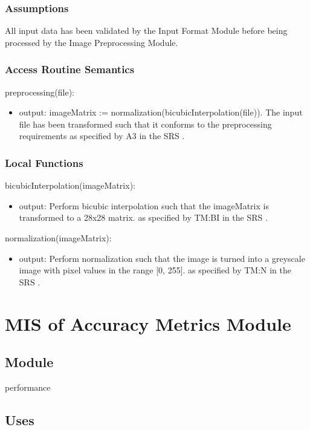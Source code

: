 \documentclass[12pt, titlepage]{article}
\begin{document}
\subsubsection{Assumptions}

All input data has been validated by the Input Format Module before being
processed by the Image Preprocessing Module.

\subsubsection{Access Routine Semantics}

\noindent preprocessing(file):
\begin{itemize} 
\item output: imageMatrix := normalization(bicubicInterpolation(file)). The
input file has been transformed such that it conforms to the preprocessing
requirements as specified by A3 in the SRS \cite[4.2.1]{SRS}.
\end{itemize}

\subsubsection{Local Functions}

\noindent bicubicInterpolation(imageMatrix):
\begin{itemize}
\item output: Perform bicubic interpolation such that the imageMatrix is
transformed to a 28x28 matrix. as specified by TM:BI in the SRS \cite[4.2.2]{SRS}.
\end{itemize}
\noindent normalization(imageMatrix):
\begin{itemize}
\item output: Perform normalization such that the image is turned into a
greyscale image with pixel values in the range [0, 255]. as specified by TM:N in
the SRS \cite[4.2.2]{SRS}.
\end{itemize}

\section{MIS of Accuracy Metrics Module} \label{mAccuracy}

\subsection{Module}

performance

\subsection{Uses}
\end{document}
